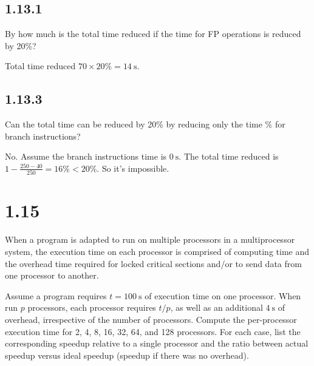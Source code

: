 \documentclass[paper=a4, fontsize=11pt]{scrartcl} %
\begin{document}
\subsection{1.13.1}
\begin{fancyquotes}
  By how much is the total time reduced if the time for FP operations
  is reduced by 20\%?
\end{fancyquotes}

Total time reduced $70\times 20\% = \SI{14}{\second}$.

\subsection{1.13.3}
\begin{fancyquotes}
  Can the total time can be reduced by 20\% by reducing only the time
  \% for branch instructions?
\end{fancyquotes}

No. Assume the branch instructions time is $\SI{0}{\second}$.
The total time reduced is $1 - \frac{250-40}{250} = 16\% < 20\%$.
So it's impossible.

\pagebreak

\section{1.15}

\begin{fancyquotes}
  When a program is adapted to run on multiple processors in a
  multiprocessor system, the execution time on each processor is
  comprised of computing time and the overhead time required for
  locked critical sections and/or to send data from one processor to
  another.

  Assume a program requires $t=\SI{100}{\second}$ of execution time on
  one processor. When run $p$ processors, each processor requires
  $t/p$, as well as an additional $\SI{4}{\second}$ of
  overhead, irrespective of the number of processors. Compute the
  per-processor execution time for 2, 4, 8, 16, 32, 64, and 128
  processors. For each case, list the corresponding speedup relative
  to a single processor and the ratio between actual speedup versus
  ideal speedup (speedup if there was no overhead).
\end{fancyquotes}
\end{document}
